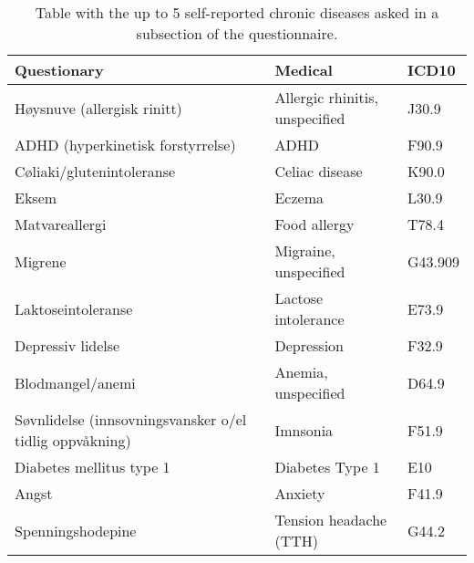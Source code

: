 \begin{table}[H]

    \caption{Table with the up to 5 self-reported chronic diseases asked in a subsection of the questionnaire.}

	\tiny

	\centering

    \label{table:Table_Common_Diseases_2}
    
	\renewcommand{\arraystretch}{1.5}

	\begin{tabular}{|lll|}
		\hline
		\rowcolor[HTML]{FFAAAA} 
		Questionary                                             & Medical                        & ICD10  \\ \hline
		
		Høysnuve (allergisk rinitt)                             & Allergic rhinitis, unspecified & J30.9                        \\
		ADHD (hyperkinetisk forstyrrelse)                       & ADHD & F90.9                            \\
		Cøliaki/glutenintoleranse                               & Celiac disease & K90.0                  \\
		Eksem                                                   & Eczema & L30.9                          \\
		Matvareallergi                                          & Food allergy & T78.4                    \\
		Migrene                                                 & Migraine, unspecified & G43.909         \\
		Laktoseintoleranse                                      & Lactose intolerance & E73.9             \\
		Depressiv lidelse                                       & Depression & F32.9                      \\
		Blodmangel/anemi                                        & Anemia, unspecified & D64.9             \\
		Søvnlidelse (innsovningsvansker o/el tidlig oppvåkning) & Imnsonia & F51.9                        \\	
		Diabetes mellitus type 1                                & Diabetes Type 1 & E10                   \\
		Angst                                                   & Anxiety & F41.9                         \\
		Spenningshodepine                                       & Tension headache (TTH) & G44.2          \\

\end{tabular}
\end{table}
